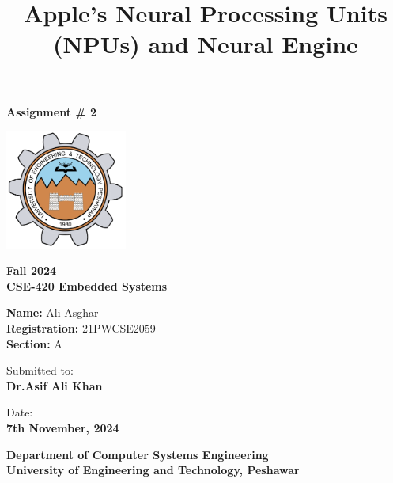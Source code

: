 \documentclass{article}
\title{Apple's Neural Processing Units (NPUs) and Neural Engine}
\author{}
\date{}
\begin{document}

\begin{titlepage}
    \centering
    {\Large \textbf{Assignment \# 2}} %
    \vspace{0.1in}
		
		\vspace*{0.3in}
    \includegraphics[width=0.3\textwidth]{./images/UetLogo.png} %
    \vspace{0.8in}
    
    {\large \textbf{Fall 2024}  \\ 
						\textbf{CSE-420 Embedded Systems}
						} %
    \vspace{0.5in} 
    
    {\large \textbf{Name:} Ali Asghar \\ 
						\textbf{Registration:} 21PWCSE2059 \\
						\textbf{Section:} A \\
		} %
    \vspace{0.5in}
		
    {\large Submitted to:\\ 
						\textbf{Dr.Asif Ali Khan} \\						
		} %
    \vspace{0.5in}

    {\large Date:\\ 
						\textbf{7th November, 2024} \\						
		} %
    \vspace{0.5in}
		
		{\large \textbf{Department of Computer Systems Engineering}\\ 
						\textbf{University of Engineering and Technology, Peshawar} \\						
		} %
		
    \vfill
\end{titlepage}
\end{document}
